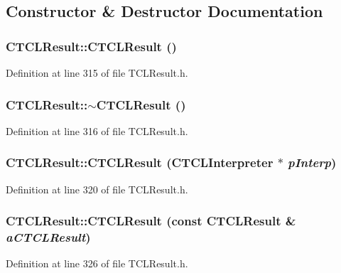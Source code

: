 \subsection{Constructor \& Destructor Documentation}
\subsubsection{\setlength{\rightskip}{0pt plus 5cm}CTCLResult::CTCLResult ()\hspace{0.3cm}{\tt  [inline]}}\label{classCTCLResult_a0}




Definition at line 315 of file TCLResult.h.
\subsubsection{\setlength{\rightskip}{0pt plus 5cm}CTCLResult::$\sim$CTCLResult ()\hspace{0.3cm}{\tt  [inline]}}\label{classCTCLResult_a1}




Definition at line 316 of file TCLResult.h.
\subsubsection{\setlength{\rightskip}{0pt plus 5cm}CTCLResult::CTCLResult ({\bf CTCLInterpreter} $\ast$ {\em p\-Interp})\hspace{0.3cm}{\tt  [inline]}}\label{classCTCLResult_a2}




Definition at line 320 of file TCLResult.h.
\subsubsection{\setlength{\rightskip}{0pt plus 5cm}CTCLResult::CTCLResult (const CTCLResult \& {\em a\-CTCLResult})\hspace{0.3cm}{\tt  [inline]}}\label{classCTCLResult_a3}




Definition at line 326 of file TCLResult.h.

